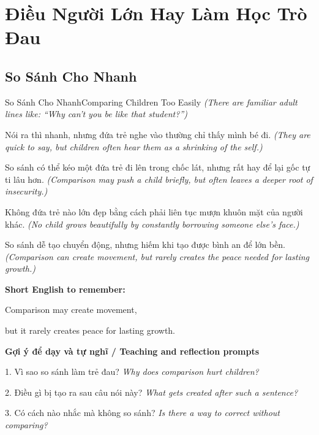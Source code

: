 \chapter{Điều Người Lớn Hay Làm Học Trò Đau}

\section{So Sánh Cho Nhanh}
\begin{truyen}{So Sánh Cho Nhanh}{Comparing Children Too Easily}
\textit{(There are familiar adult lines like: “Why can’t you be like that student?”)}

Nói ra thì nhanh, nhưng đứa trẻ nghe vào thường chỉ thấy mình bé đi.
\textit{(They are quick to say, but children often hear them as a shrinking of the self.)}

So sánh có thể kéo một đứa trẻ đi lên trong chốc lát, nhưng rất hay để lại gốc tự ti lâu hơn.
\textit{(Comparison may push a child briefly, but often leaves a deeper root of insecurity.)}

Không đứa trẻ nào lớn đẹp bằng cách phải liên tục mượn khuôn mặt của người khác.
\textit{(No child grows beautifully by constantly borrowing someone else’s face.)}

\end{truyen}

\begin{baihoc}
So sánh dễ tạo chuyển động, nhưng hiếm khi tạo được bình an để lớn bền.
\textit{(Comparison can create movement, but rarely creates the peace needed for lasting growth.)}
\end{baihoc}

\begin{ghinhoanh}
\textbf{Short English to remember:}

Comparison may create movement,

but it rarely creates peace for lasting growth.

\end{ghinhoanh}

\begin{tuhocnhanh}
\textbf{Gợi ý để dạy và tự nghĩ / Teaching and reflection prompts}

1. Vì sao so sánh làm trẻ đau? \textit{Why does comparison hurt children?}

2. Điều gì bị tạo ra sau câu nói này? \textit{What gets created after such a sentence?}

3. Có cách nào nhắc mà không so sánh? \textit{Is there a way to correct without comparing?}
\end{tuhocnhanh}
\ngancach

